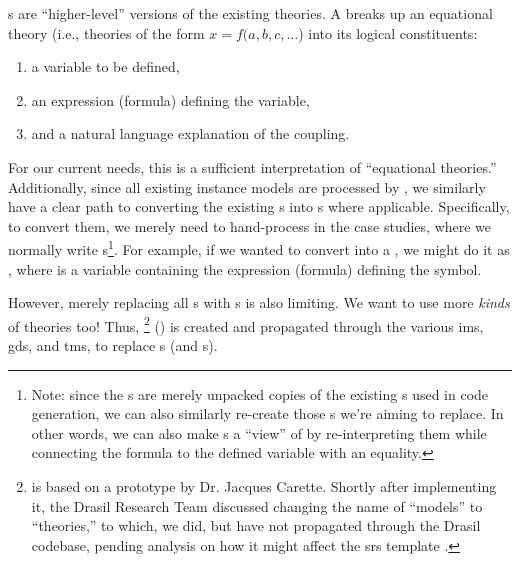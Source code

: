 \originalQDefinitionHaskell{}

\QDefinition{}s are ``higher-level'' versions of the existing theories. A
\QDefinition{} breaks up an equational theory (i.e., theories of the form \(x =
f(a, b, c, \ldots{}\)) into its logical constituents:
\begin{enumerate}
    \item a variable to be defined,
    \item an expression (formula) defining the variable,
    \item and a natural language explanation of the coupling.
\end{enumerate}

For our current needs, this is a sufficient interpretation of ``equational
theories.'' Additionally, since all existing instance models are processed by
\relToQD{}, we similarly have a clear path to converting the existing
\RelationConcept{}s into \QDefinition{}s where applicable. Specifically, to
convert them, we merely need to hand-process \relToQD{} in the case studies,
where we normally write \RelationConcept{}s\footnote{Note: since the
    \QDefinition{}s are merely unpacked copies of the existing \RelationConcept{}s
    used in code generation, we can also similarly re-create those
    \RelationConcept{}s we're aiming to replace. In other words, we can also make
    \RelationConcept{}s a ``view'' of \QDefinition{} by re-interpreting them while
    connecting the formula to the defined variable with an equality.}. For example,
if we wanted to convert  into a \QDefinition, we might do it
as , where  is a variable
containing the expression (formula) defining the  symbol.

\currentLandPosRCtoQD{}

However, merely replacing all \RelationConcept{}s with \QDefinition{}s is also
limiting. We want to use more \textit{kinds} of theories too! Thus,
\ModelKinds{} \footnote{\ModelKinds{} is based on a prototype by Dr. Jacques
    Carette. Shortly after implementing it, the Drasil Research Team discussed
    changing the name of ``models'' to ``theories,'' to which, we did, but have not
    propagated through the Drasil codebase, pending analysis on how it might affect
    the \acs{srs} template \cite{DrasilIssue2599RenamingModels}.}
() is created and propagated through the
various \acsp{im}, \acsp{gd}, and \acsp{tm}, to replace \RelationConcept{}s (and
\Relation{}s).

